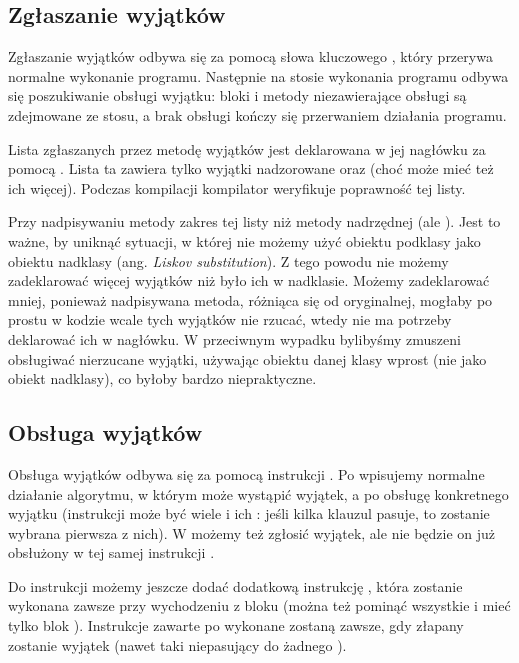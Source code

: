 \subsection{Zgłaszanie wyjątków}

Zgłaszanie wyjątków odbywa się za pomocą słowa kluczowego , który przerywa normalne wykonanie programu. Następnie na stosie wykonania programu odbywa się poszukiwanie obsługi wyjątku: bloki i metody niezawierające obsługi są zdejmowane ze stosu, a brak obsługi kończy się przerwaniem działania programu.

Lista zgłaszanych przez metodę wyjątków jest deklarowana w jej nagłówku za pomocą . Lista ta zawiera tylko wyjątki nadzorowane oraz  (choć może mieć też ich więcej). Podczas kompilacji kompilator weryfikuje poprawność tej listy.

Przy nadpisywaniu metody zakres tej listy  niż metody nadrzędnej (ale ). Jest to ważne, by uniknąć sytuacji, w której nie możemy użyć obiektu podklasy jako obiektu nadklasy (ang. \textit{Liskov substitution}). Z tego powodu nie możemy zadeklarować więcej wyjątków niż było ich w nadklasie. Możemy zadeklarować mniej, ponieważ nadpisywana metoda, różniąca się od oryginalnej, mogłaby po prostu w kodzie wcale tych wyjątków nie rzucać, wtedy nie ma potrzeby deklarować ich w nagłówku. W przeciwnym wypadku bylibyśmy zmuszeni obsługiwać nierzucane wyjątki, używając obiektu danej klasy wprost (nie jako obiekt nadklasy), co byłoby bardzo niepraktyczne.

\subsection{Obsługa wyjątków}

Obsługa wyjątków odbywa się za pomocą instrukcji . Po  wpisujemy normalne działanie algorytmu, w którym może wystąpić wyjątek, a po  obsługę konkretnego wyjątku (instrukcji  może być wiele i ich : jeśli kilka klauzul pasuje, to zostanie wybrana pierwsza z nich). W  możemy też zgłosić wyjątek, ale nie będzie on już obsłużony w tej samej instrukcji .

Do instrukcji  możemy jeszcze dodać dodatkową instrukcję , która zostanie wykonana zawsze przy wychodzeniu z bloku  (można też pominąć wszystkie  i mieć tylko blok ). Instrukcje zawarte po  wykonane zostaną zawsze, gdy złapany zostanie wyjątek (nawet taki niepasujący do żadnego ).


